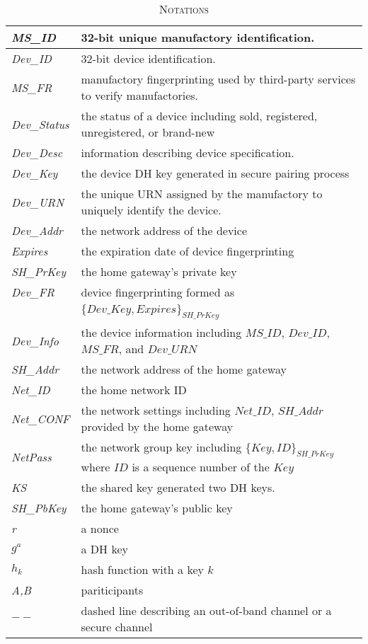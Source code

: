 \begin{table}[t]
\centering
\caption{\textsc{Notations}}
\label{notation}
{\small
\begin{tabular}{| l | p{6.5cm} |}
 \hline
\emph{MS\_ID} & 32-bit unique manufactory identification. \\ \hline
\emph{Dev\_ID} & 32-bit device identification. \\ \hline
\emph{MS\_FR} & manufactory fingerprinting used by third-party services to verify manufactories. \\ \hline
\emph{Dev\_Status} & the status of a device including sold, registered, unregistered, or brand-new \\ \hline
\emph{Dev\_Desc} & information describing device specification. \\ \hline
\emph{Dev\_Key} & the device DH key generated in secure pairing process \\ \hline
\emph{Dev\_URN} & the unique URN assigned by the manufactory to uniquely identify the device. \\ \hline
\emph{Dev\_Addr} & the network address of the device \\ \hline
\emph{Expires} & the expiration date of device fingerprinting \\ \hline
\emph{SH\_PrKey} & the home gateway's private key \\ \hline
\emph{Dev\_FR} & device fingerprinting formed as \\
 & $\{Dev\_Key, Expires\}_{SH\_PrKey}$ \\ \hline
\emph{Dev\_Info} & the device information including $MS\_ID$, $Dev\_ID$, $MS\_FR$, and $Dev\_URN$ \\ \hline 
\emph{SH\_Addr} & the network address of the home gateway \\ \hline
\emph{Net\_ID} & the home network ID \\ \hline
\emph{Net\_CONF} & the network settings including $Net\_ID$, $SH\_Addr$ provided by the home gateway \\ \hline
\emph{NetPass} & the network group key including $\{Key,ID\}_{SH\_PrKey}$ where $ID$ is a sequence number of the $Key$ \\ \hline
\emph{KS} & the shared key generated two DH keys. \\ \hline
\emph{SH\_PbKey} & the home gateway's public key \\ \hline \hline

\emph{r} & a nonce \\ \hline
\emph{$g^a$} & a DH key \\ \hline
\emph{$h_k$} & hash function with a key $k$ \\ \hline
\emph{A,B} & pariticipants \\ \hline
$--$ & dashed line describing an out-of-band channel or a secure channel \\ \hline
\end{tabular}
}
\end{table}

